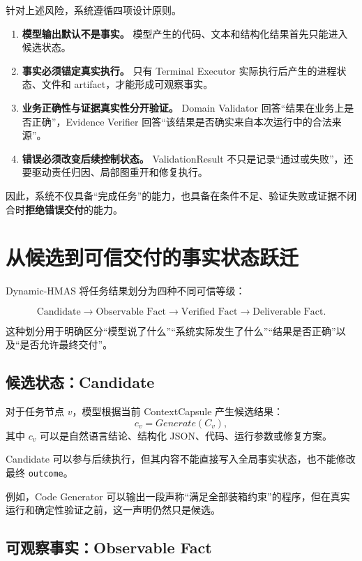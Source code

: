 \documentclass[UTF8,a4paper,12pt,oneside]{ctexbook}
\begin{document}
针对上述风险，系统遵循四项设计原则。

\begin{enumerate}
    \item \textbf{模型输出默认不是事实。}
    模型产生的代码、文本和结构化结果首先只能进入候选状态。

    \item \textbf{事实必须锚定真实执行。}
    只有 Terminal Executor 实际执行后产生的进程状态、文件和 artifact，才能形成可观察事实。

    \item \textbf{业务正确性与证据真实性分开验证。}
    Domain Validator 回答“结果在业务上是否正确”，Evidence Verifier 回答“该结果是否确实来自本次运行中的合法来源”。

    \item \textbf{错误必须改变后续控制状态。}
    ValidationResult 不只是记录“通过或失败”，还要驱动责任归因、局部图重开和修复执行。
\end{enumerate}

因此，系统不仅具备“完成任务”的能力，也具备在条件不足、验证失败或证据不闭合时\textbf{拒绝错误交付}的能力。


\section{从候选到可信交付的事实状态跃迁}

Dynamic-HMAS 将任务结果划分为四种不同可信等级：

\[
\text{Candidate}
\rightarrow
\text{Observable Fact}
\rightarrow
\text{Verified Fact}
\rightarrow
\text{Deliverable Fact}.
\]

这种划分用于明确区分“模型说了什么”“系统实际发生了什么”“结果是否正确”以及“是否允许最终交付”。

\subsection{候选状态：Candidate}

对于任务节点 $v$，模型根据当前 ContextCapsule 产生候选结果：
\[
c_v = Generate(C_v),
\]
其中 $c_v$ 可以是自然语言结论、结构化 JSON、代码、运行参数或修复方案。

Candidate 可以参与后续执行，但其内容不能直接写入全局事实状态，也不能修改最终 \texttt{outcome}。

例如，Code Generator 可以输出一段声称“满足全部装箱约束”的程序，但在真实运行和确定性验证之前，这一声明仍然只是候选。


\subsection{可观察事实：Observable Fact}
\end{document}
